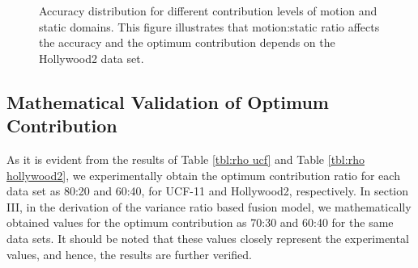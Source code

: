 \begin{figure}
\caption{Accuracy distribution for different contribution levels of motion and static domains.
This figure illustrates that motion:static ratio affects the accuracy and the optimum contribution depends on the Hollywood2 data set.}
\label{contribution chart}
\end{figure}

\subsection{Mathematical Validation of Optimum Contribution}

As it is evident from the results of Table \ref{tbl:rho ucf} and Table \ref{tbl:rho hollywood2}, we experimentally obtain the
optimum contribution ratio for each data set as 80:20 and 60:40, for UCF-11 and Hollywood2, respectively. In section III, in the derivation of the variance ratio based fusion model,
we mathematically obtained values for the optimum contribution as 70:30 and 60:40 for the same data sets. It should be noted that these values closely
represent the experimental values, and hence, the results are further verified.


